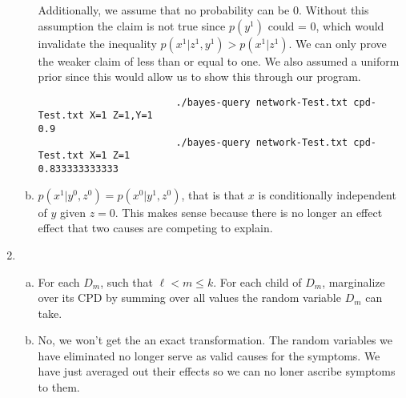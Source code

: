 \documentclass[12pt]{article}
\begin{document}
\begin{enumerate}
\begin{enumerate}[(a)]
						Additionally, we assume that no probability can be 0. Without this assumption the claim is not true since $p(y^1)$ could = 0, which would invalidate the inequality $p(x^1|z^1,y^1) > p(x^1|z^1)$. We can only prove the weaker claim of less than or equal to one. We also assumed a uniform prior since this would allow us to show this through our program.
						\begin{verbatim}
						./bayes-query network-Test.txt cpd-Test.txt X=1 Z=1,Y=1
0.9
						./bayes-query network-Test.txt cpd-Test.txt X=1 Z=1
0.833333333333
						\end{verbatim}
						\item $p(x^1|y^0,z^0) = p(x^0|y^1,z^0)$, that is that $x$ is conditionally independent of $y$ given $z=0$. This makes sense because there is no longer an effect effect that two causes are competing to explain. 
					\end{enumerate}
				\item 
					\begin{enumerate}[(a)]
							\item For each $D_m$, such that $\ell < m \leq k$. For each child of $D_m$, marginalize over its CPD by summing over all values the random variable $D_m$ can take. 
							\item No, we won't get the an exact transformation. The random variables we have eliminated no longer serve as valid causes for the symptoms. We have just averaged out their effects so we can no loner ascribe symptoms to them.						
			
					\end{enumerate}
		\end{enumerate}
\end{document}
